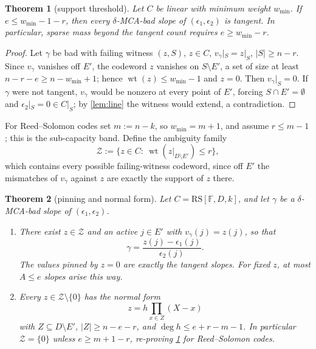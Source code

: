 \documentclass[11pt]{amsart}
\newtheorem{theorem}{Theorem}[section]
\theoremstyle{definition}
\theoremstyle{remark}
\newcommand{\F}{\mathbb{F}}
\newcommand{\RS}{\mathrm{RS}}
\newcommand{\wt}{\operatorname{wt}}
\begin{document}
\begin{theorem}[support threshold]\label{thm:sparse-threshold}
Let $C$ be linear with minimum weight $w_{\min}$.  If $e\le w_{\min}-1-r$, then every $\delta$-MCA-bad slope of $(\epsilon_1,\epsilon_2)$ is tangent.  In particular, sparse mass beyond the tangent count requires $e\ge w_{\min}-r$.
\end{theorem}

\begin{proof}
Let $\gamma$ be bad with failing witness $(z,S)$, $z\in C$, $v_\gamma|_S=z|_S$, $|S|\ge n-r$.  Since $v_\gamma$ vanishes off $E'$, the codeword $z$ vanishes on $S\setminus E'$, a set of size at least $n-r-e\ge n-w_{\min}+1$; hence $\wt(z)\le w_{\min}-1$ and $z=0$.  Then $v_\gamma|_S=0$.  If $\gamma$ were not tangent, $v_\gamma$ would be nonzero at every point of $E'$, forcing $S\cap E'=\emptyset$ and $\epsilon_2|_S=0\in C|_S$; by \cref{lem:line} the witness would extend, a contradiction.
\end{proof}

For Reed--Solomon codes set $m:=n-k$, so $w_{\min}=m+1$, and assume $r\le m-1$; this is the sub-capacity band.  Define the ambiguity family
\[
        \mathcal Z:=\{z\in C:\ \wt(z|_{D\setminus E'})\le r\},
\]
which contains every possible failing-witness codeword, since off $E'$ the mismatches of $v_\gamma$ against $z$ are exactly the support of $z$ there.

\begin{theorem}[pinning and normal form]\label{thm:pinning}
Let $C=\RS[\F,D,k]$, and let $\gamma$ be a $\delta$-MCA-bad slope of $(\epsilon_1,\epsilon_2)$.
\begin{enumerate}
\item There exist $z\in\mathcal Z$ and an active $j\in E'$ with $v_\gamma(j)=z(j)$, so that
\[
        \gamma=\frac{z(j)-\epsilon_1(j)}{\epsilon_2(j)}.
\]
The values pinned by $z=0$ are exactly the tangent slopes.  For fixed $z$, at most $A\le e$ slopes arise this way.
\item Every $z\in\mathcal Z\setminus\{0\}$ has the normal form
\[
        z=h\prod_{x\in Z}(X-x)
\]
with $Z\subseteq D\setminus E'$, $|Z|\ge n-e-r$, and $\deg h\le e+r-m-1$.  In particular $\mathcal Z=\{0\}$ unless $e\ge m+1-r$, re-proving \cref{thm:sparse-threshold} for Reed--Solomon codes.
\end{enumerate}
\end{theorem}
\end{document}
